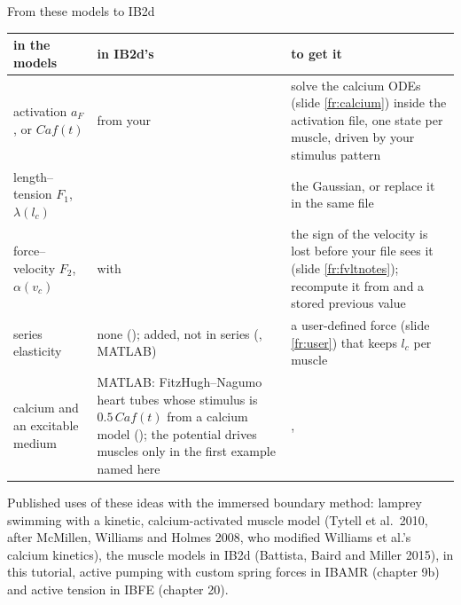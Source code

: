 \documentclass[aspectratio=169,11pt]{beamer}
\begin{document}
\begin{frame}{From these models to IB2d}
\label{fr:map}
\tiny
\begin{tabular}{@{}L{0.26\textwidth}L{0.3\textwidth}L{0.36\textwidth}@{}}
\toprule
in the models & in IB2d's  & to get it \\
\midrule
activation $a_F$, or $Caf(t)$ &  from your \allowbreak{} & solve the calcium ODEs (slide \ref{fr:calcium}) inside the activation file, one state per muscle, driven by your stimulus pattern \\
length--tension $F_1$, $\lambda(l_c)$ &  & the Gaussian, or replace it in the same file \\
force--velocity $F_2$, $\alpha(v_c)$ &  with  & the sign of the velocity is lost before your file sees it (slide \ref{fr:fvltnotes}); recompute it from  and a stored previous value \\
series elasticity & none (); added, not in series (, MATLAB) & a user-defined force (slide \ref{fr:user}) that keeps $l_c$ per muscle \\
calcium and an excitable medium & MATLAB: FitzHugh--Nagumo heart tubes whose stimulus is $0.5\,Caf(t)$ from a calcium model (); the potential drives muscles only in the first example named here & \allowbreak{}, \allowbreak{} \\
\bottomrule
\end{tabular}

\vspace{2mm}
\small Published uses of these ideas with the immersed boundary method: lamprey swimming with a kinetic, calcium-activated muscle model (Tytell et al.\ 2010, after McMillen, Williams and Holmes 2008, who modified Williams et al.'s calcium kinetics), the muscle models in IB2d (Battista, Baird and Miller 2015), in this tutorial, active pumping with custom spring forces in IBAMR (chapter 9b) and active tension in IBFE (chapter 20).
\end{frame}
\end{document}
